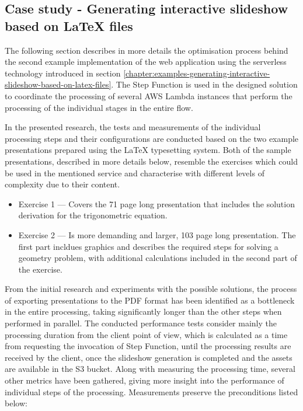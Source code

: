 \subsection{Case study - Generating interactive slideshow based on LaTeX files} \label{chapter:latex-processing-optimisation}

The following section describes in more details the optimisation process behind the second example implementation of the web application using the serverless technology introduced in section \ref{chapter:examples-generating-interactive-slideshow-based-on-latex-files}.
The Step Function is used in the designed solution to coordinate the processing of several AWS Lambda instances that perform the processing of the individual stages in the entire flow.

In the presented research, the tests and measurements of the individual processing steps and their configurations are conducted based on the two example presentations prepared using the LaTeX typesetting system.
Both of the sample presentations, described in more details below, resemble the exercises which could be used in the mentioned service and characterise with different levels of complexity due to their content.

\begin{itemize}
   \item Exercise 1 --- Covers the 71 page long presentation that includes the solution derivation for the trigonometric equation.
   \item Exercise 2 --- Is more demanding and larger, 103 page long presentation. The first part incldues graphics and describes the required steps for solving a geometry problem, with additional calculations included in the second part of the exercise.
\end{itemize}

From the initial research and experiments with the possible solutions, the process of exporting presentations to the PDF format has been identified as a bottleneck in the entire processing, taking significantly longer than the other steps when performed in parallel.
The conducted performance tests consider mainly the processing duration from the client point of view, which is calculated as a time from requesting the invocation of Step Function, until the processing results are received by the client, once the slideshow generation is completed and the assets are available in the S3 bucket.
Along with measuring the processing time, several other metrics have been gathered, giving more insight into the performance of individual steps of the processing.
Measurements preserve the preconditions listed below:

